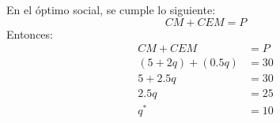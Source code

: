 En el óptimo social, se cumple lo siguiente:
	$$CM + CEM = P$$
Entonces:
	\begin{align*}
		CM + CEM &= P\\
		\left(5+2q\right) + \left(0.5q\right) &= 30\\
		5 + 2.5q &= 30\\
		2.5q &= 25\\
		q^* &= 10
	\end{align*}